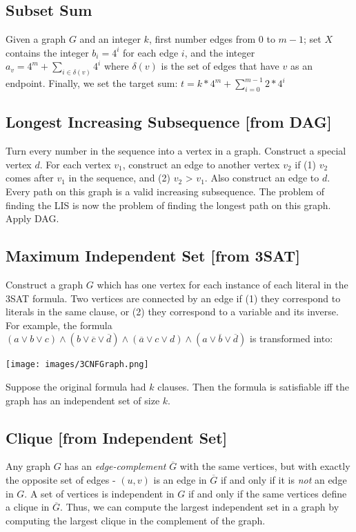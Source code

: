 \subsection{Subset Sum}

Given a graph $G$ and an integer $k$, first number edges from 0 to $m-1$; set $X$ contains the integer $b_{i} = 4^{i}$ for each edge $i$, and the integer $a_{v} = 4^{m} + \sum_{i \in \delta(v)}{4^i}$ where $\delta(v)$ is the set of edges that have $v$ as an endpoint. Finally, we set the target sum: $t = k * 4^m + \sum_{i = 0}^{m-1}{2 * 4^i}$

\subsection{Longest Increasing Subsequence [from DAG]}

Turn every number in the sequence into a vertex in a graph. Construct a special vertex $d$. For each vertex $v_1$, construct an edge to another vertex $v_2$ if (1) $v_2$ comes after $v_1$ in the sequence, and (2) $v_2$ > $v_1$. Also construct an edge to $d$.\\ 

Every path on this graph is a valid increasing subsequence. The problem of finding the LIS is now the problem of finding the longest path on this graph. Apply DAG.

\subsection{Maximum Independent Set [from 3SAT]}

Construct a graph $G$ which has one vertex for each instance of each literal in the 3SAT formula. Two vertices are connected by an edge if (1) they correspond to literals in the same clause, or (2) they correspond to a variable and its inverse. For example, the formula $(a \vee b \vee c) \wedge (b \vee \overline{c} \vee \overline{d}) \wedge (\overline{a} \vee c \vee d) \wedge (a \vee \overline{b} \vee \overline{d})$ is transformed into:

\texttt{[image: images/3CNFGraph.png]}

Suppose the original formula had $k$ clauses. Then the formula is satisfiable iff the graph has an independent set of size $k$.

\subsection{Clique [from Independent Set]}
Any graph $G$ has an \emph{edge-complement} $\overline{G}$ with the same vertices, but with exactly the opposite set of edges - $(u, v)$ is an edge in $\overline{G}$ if and only if it is \emph{not} an edge in $G$. A set of vertices is independent in $G$ if and only if the same vertices define a clique in $\overline{G}$. Thus, we can compute the largest independent set in a graph by computing the largest clique in the complement of the graph.


